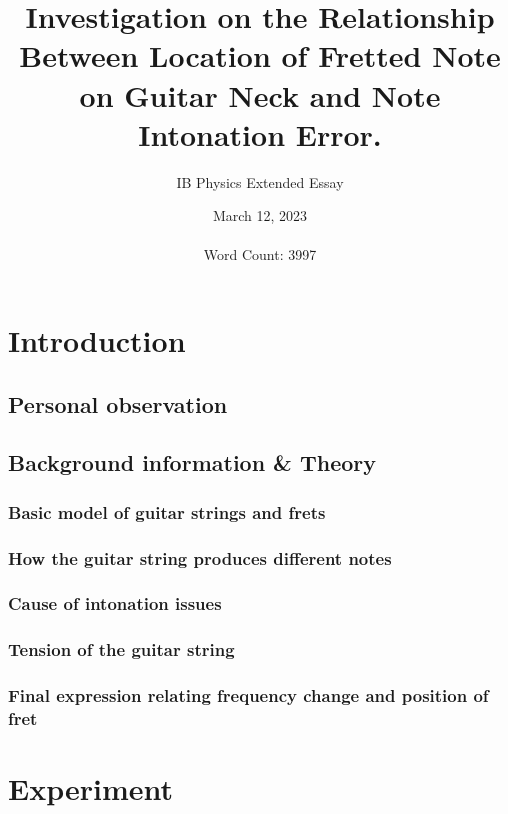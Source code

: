 \documentclass[12pt]{article}
\title{Investigation on the Relationship Between Location of Fretted Note on Guitar Neck and Note Intonation Error.}
\author{IB Physics Extended Essay}
\date{March 12, 2023 \\~\\\tiny Word Count: 3997}
\begin{document}
    \maketitle
    \newpage
    \tableofcontents
    \newpage
    \begin{flushleft}
        \section{Introduction}
            \subsection{Personal observation}
                
            \subsection{Background information \& Theory}
                \subsubsection*{Basic model of guitar strings and frets}
                    
                \subsubsection*{How the guitar string produces different notes}
                    
                \subsubsection*{Cause of intonation issues}
                    
                \subsubsection*{Tension of the guitar string}
                    
                \subsubsection*{Final expression relating frequency change and position of fret}
                    
        \section{Experiment}
            

\end{flushleft}
\end{document}
